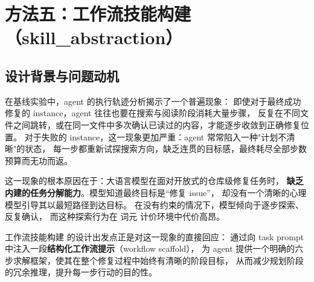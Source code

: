 \begin{table}[htbp]
\centering
\caption{语义重排序压缩参数配置}
\label{tab:llmlingua-params}


\end{table}


\section{方法五：工作流技能构建 （skill\_abstraction）}
\label{sec:skill-abstraction}

\subsection{设计背景与问题动机}
\label{subsec:skill-abs-motivation}

在基线实验中，agent 的执行轨迹分析揭示了一个普遍现象：
即使对于最终成功修复的 instance，agent 往往也要在搜索与阅读阶段消耗大量步骤，
反复在不同文件之间跳转，或在同一文件中多次确认已读过的内容，才能逐步收敛到正确修复位置。
对于失败的 instance，这一现象更加严重：agent 常常陷入一种"计划不清晰"的状态，
每一步都重新试探搜索方向，缺乏连贯的目标感，最终耗尽全部步数预算而无功而返。

这一现象的根本原因在于：大语言模型在面对开放式的仓库级修复任务时，
\textbf{缺乏内建的任务分解能力}。模型知道最终目标是“修复 issue”，
却没有一个清晰的心理模型引导其以最短路径到达目标。
在没有约束的情况下，模型倾向于逐步探索、反复确认，
而这种探索行为在 词元 计价环境中代价高昂。

工作流技能构建 的设计出发点正是对这一现象的直接回应：
通过向 task prompt 中注入一段\textbf{结构化工作流提示}（workflow scaffold），
为 agent 提供一个明确的六步求解框架，使其在整个修复过程中始终有清晰的阶段目标，
从而减少规划阶段的冗余推理，提升每一步行动的目的性。

